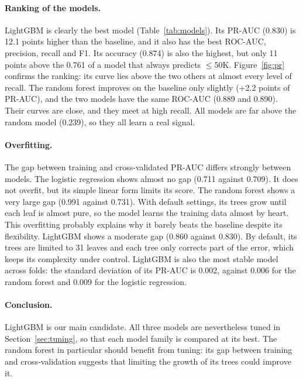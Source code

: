 \documentclass[10pt,a4paper]{article}
\newcommand{\low}{$\leq$50K}
\begin{document}
\paragraph{Ranking of the models.}
LightGBM is clearly the best model (Table~\ref{tab:models}). Its PR-AUC (0.830) is 12.1
points higher than the baseline, and it also has the best ROC-AUC, precision, recall and
F1. Its accuracy (0.874) is also the highest, but only 11 points above the 0.761 of a model
that always predicts \low{}. Figure~\ref{fig:pr} confirms the ranking: its curve lies above the two others at almost every
level of recall. The random forest improves on the baseline only slightly (+2.2 points of
PR-AUC), and the two models have the same ROC-AUC (0.889 and 0.890). Their curves are
close, and they meet at high recall. All models are far above the random model (0.239),
so they all learn a real signal.

\paragraph{Overfitting.}
The gap between training and cross-validated PR-AUC differs strongly between models. The
logistic regression shows almost no gap (0.711 against 0.709). It does not overfit, but
its simple linear form limits its score. The random forest shows a very large gap (0.991 against 0.731). With default
settings, its trees grow until each leaf is almost pure, so the model learns the training
data almost by heart. This overfitting probably explains why it barely beats the baseline
despite its flexibility. LightGBM shows a moderate gap (0.860 against 0.830). By default,
its trees are limited to 31 leaves and each tree only corrects part of the error, which
keeps its complexity under control. LightGBM is also the most stable model across folds:
the standard deviation of its PR-AUC is 0.002, against 0.006 for the random forest and
0.009 for the logistic regression.

\paragraph{Conclusion.}
LightGBM is our main candidate. All three models are nevertheless tuned in
Section~\ref{sec:tuning}, so that each model family is compared at its best. The random
forest in particular should benefit from tuning: its gap between training and
cross-validation suggests that limiting the growth of its trees could improve it.

\end{document}
